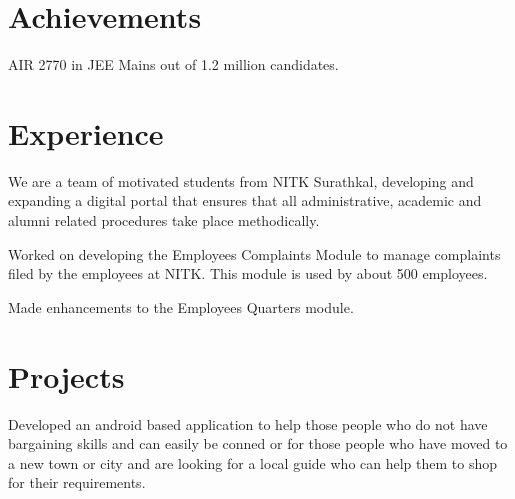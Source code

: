 \documentclass[]{deedy-resume-openfont}
\begin{document}
\begin{minipage}[t]{0.33\textwidth}

\section{Achievements} 
AIR 2770 in JEE Mains out of 1.2 million candidates.\\
\sectionsep

%
%

\end{minipage} 
\hfill
\begin{minipage}[t]{0.66\textwidth} 


\section{Experience}

\vspace{\topsep}
\begin{tightemize}
\item We are a team of motivated students from NITK Surathkal, developing and expanding a digital portal that ensures that all administrative, academic and alumni related procedures take place methodically.\item Worked on developing the Employees Complaints Module to manage complaints filed by the employees at NITK. This module is used by about 500 employees.\item Made enhancements to the Employees Quarters module.
\end{tightemize}
\sectionsep


\section{Projects}
\begin{tightemize}
\item Developed an android based application to help those people who do not have bargaining skills and can easily be conned or for those people who have moved to a new town or city and are looking for a local guide who can help them to shop for their requirements.
\end{tightemize}
\sectionsep


\end{minipage}
\end{document}
